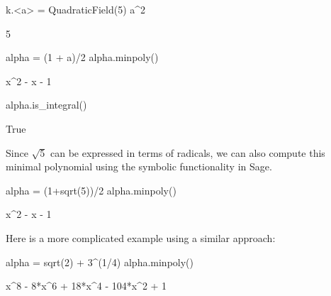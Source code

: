 \begin{sagecode}
\begin{sagecell}
k.<a> = QuadraticField(5)
a^2
\end{sagecell}
\begin{sageout}
5
\end{sageout}
\begin{sagecell}
alpha = (1 + a)/2
alpha.minpoly()
\end{sagecell}
\begin{sageout}
x^2 - x - 1
\end{sageout}
\begin{sagecell}
alpha.is_integral()
\end{sagecell}
\begin{sageout}
True
\end{sageout}
\end{sagecode}

Since $\sqrt{5}$ can be expressed in terms of radicals, we can also
compute this minimal polynomial using the symbolic functionality in
Sage.
\begin{sagecode}
\begin{sagecell}
alpha = (1+sqrt(5))/2
alpha.minpoly()
\end{sagecell}
\begin{sageout}
x^2 - x - 1
\end{sageout}
Here is a more complicated example using a similar approach:
\begin{sagecell}
alpha = sqrt(2) + 3^(1/4)
alpha.minpoly()
\end{sagecell}
\begin{sageout}
x^8 - 8*x^6 + 18*x^4 - 104*x^2 + 1
\end{sageout}
\end{sagecode}

